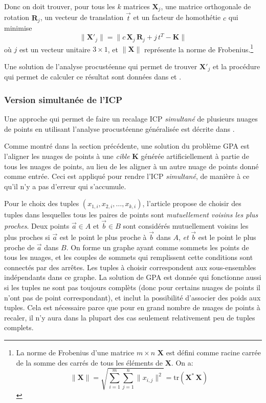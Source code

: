 \documentclass[a4paper,10pt]{scrreprt}
\begin{document}
Donc on doit trouver, pour tous les $k$ matrices $\mathbf{X}_j$, une matrice orthogonale de rotation $\mathbf{R}_j$, un vecteur de translation $\vec{t}$ et un facteur de homothétie $c$ qui minimise
\begin{equation}
	\| \mathbf{X'}_j \| = \| c \, \mathbf{X}_j \, \mathbf{R}_j + j \, t^T - \mathbf{K} \|
\end{equation}
où $j$ est un vecteur unitaire $3 \times 1$, et $\|\mathbf{X}\|$ représente la norme de Frobenius.\footnote{La norme de Frobenius d'une matrice $m \times n$ $\mathbf{X}$ est défini comme racine carrée de la somme des carrés de tous les éléments de $\mathbf{X}$. On a:\begin{equation}
	\| \mathbf{X} \|
	= \sqrt{ \sum_{i=1}^{m} \sum_{j=1}^{n} \| x_{i,j} \|^2 }
	= \text{tr}(\mathbf{X}^* \, \mathbf{X})
\end{equation}}

Une solution de l'analyse procustéenne qui permet de trouver $\mathbf{X'}_j$ et la procédure qui permet de calculer ce résultat sont données dans \cite{Scho1970} et \cite{Scho1966}. 


\subsubsection{Version simultanée de l'ICP}
Une approche qui permet de faire un recalage ICP \emph{simultané} de plusieurs nuages de points en utilisant l'analyse procustéenne généralisée est décrite dans \cite{Told2010}.

Comme montré dans la section précédente, une solution du problème GPA est l'aligner les nuages de points à une \emph{cible} $\mathbf{K}$ générée artificiellement à partie de tous les nuages de points, au lieu de les aligner à un autre nuage de points donné comme entrée. Ceci est appliqué pour rendre l'ICP \emph{simultané}, de manière à ce qu'il n'y a pas d'erreur qui s'accumule.

Pour le choix des tuples ${(x_{1,i}, x_{2,i}, \ldots, x_{k,i})}$, l'article propose de choisir des tuples dans lesquelles tous les paires de points sont \emph{mutuellement voisins les plus proches}. Deux points $\vec{a} \in A$ et $\vec{b} \in B$ sont considérés mutuellement voisins les plus proches si $\vec{a}$ est le point le plus proche à $\vec{b}$ dans $A$, \emph{et} $\vec{b}$ est le point le plus proche de $\vec{a}$ dans $B$. On forme un graphe ayant comme sommets les points de tous les nuages, et les couples de sommets qui remplissent cette conditions sont connectés par des arrêtes. Les tuples à choisir correspondent aux sous-ensembles indépendants dans ce graphe. La solution de GPA est donnée qui fonctionne aussi si les tuples ne sont pas toujours complèts (donc pour certains nuages de points il n'ont pas de point correspondant), et inclut la possibilité d'associer des poids aux tuples. Cela est nécessaire parce que pour en grand nombre de nuages de points à recaler, il n'y aura dans la plupart des cas seulement relativement peu de tuples complets.
\end{document}
